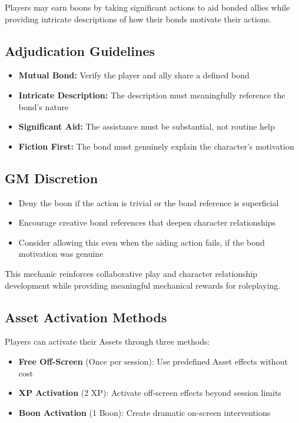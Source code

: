 Players may earn boons by taking significant actions to aid bonded allies while providing intricate descriptions of how their bonds motivate their actions.

\subsection{Adjudication Guidelines}
\begin{itemize}
    \item \textbf{Mutual Bond:} Verify the player and ally share a defined bond
    \item \textbf{Intricate Description:} The description must meaningfully reference the bond's nature
    \item \textbf{Significant Aid:} The assistance must be substantial, not routine help
    \item \textbf{Fiction First:} The bond must genuinely explain the character's motivation
\end{itemize}

\subsection{GM Discretion}
\begin{itemize}
    \item Deny the boon if the action is trivial or the bond reference is superficial
    \item Encourage creative bond references that deepen character relationships
    \item Consider allowing this even when the aiding action fails, if the bond motivation was genuine
\end{itemize}

This mechanic reinforces collaborative play and character relationship development while providing meaningful mechanical rewards for roleplaying.

\subsection{Asset Activation Methods}
Players can activate their Assets through three methods:
\begin{itemize}
    \item \textbf{Free Off-Screen} (Once per session): Use predefined Asset effects without cost
    \item \textbf{XP Activation} (2 XP): Activate off-screen effects beyond session limits
    \item \textbf{Boon Activation} (1 Boon): Create dramatic on-screen interventions
\end{itemize}

